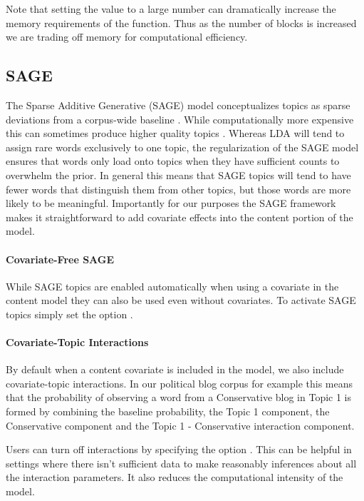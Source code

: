 \documentclass[nojss]{jss}
\begin{document}
Note that setting the  value to a large number can dramatically increase the memory requirements of the function.  Thus as the number of blocks is increased we are trading off memory for computational efficiency.  

\subsection{SAGE}
The Sparse Additive Generative (SAGE) model conceptualizes topics as sparse deviations from a corpus-wide baseline \citep{eisenstein2011sparse}.  While computationally more expensive this can sometimes produce higher quality topics .  Whereas LDA will tend to assign rare words exclusively to one topic, the regularization of the SAGE model ensures that words only load onto topics when they have sufficient counts to overwhelm the prior.  In general this means that SAGE topics will tend to have fewer words that distinguish them from other topics, but those words are more likely to be meaningful.  Importantly for our purposes the SAGE framework makes it straightforward to add covariate effects into the content portion of the model.

\paragraph{Covariate-Free SAGE}
While SAGE topics are enabled automatically when using a covariate in the content model they can also be used even without covariates.  To activate SAGE topics simply set the option .

\paragraph{Covariate-Topic Interactions}
By default when a content covariate is included in the model, we also include covariate-topic interactions.  In our political blog corpus for example this means that the probability of observing a word from a Conservative blog in Topic 1 is formed by combining the baseline probability, the Topic 1 component, the Conservative component and the Topic 1 - Conservative interaction component.

Users can turn off interactions by specifying the option .  This can be helpful in settings where there isn't sufficient data to make reasonably inferences about all the interaction parameters.  It also reduces the computational intensity of the model.
\end{document}
